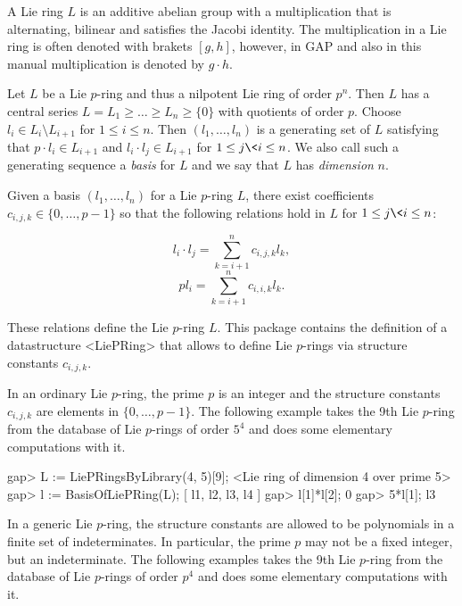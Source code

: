

A Lie ring $L$ is an additive abelian group with a multiplication that
is alternating, bilinear and satisfies the Jacobi identity. The 
multiplication in a Lie ring is often denoted with brakets $[g,h]$, 
however, in GAP and also in this manual multiplication is denoted by
$g \cdot h$. 

Let $L$ be a Lie $p$-ring and thus a nilpotent Lie ring of order $p^n$.
Then $L$ has a central series $L = L_1 \geq \ldots \geq L_n \geq \{0\}$ 
with quotients of order $p$. Choose $l_i \in L_i \setminus L_{i+1}$ for 
$1 \leq i \leq n$. Then $(l_1, \ldots, l_n)$ is a generating set of $L$ 
satisfying that $p \cdot l_i \in L_{i+1}$ and $l_i \cdot l_j \in L_{i+1}$ 
for $1 \leq j \< i \leq n$. We also call such a generating sequence
a {\it basis} for $L$ and we say that $L$ has {\it dimension} $n$.

Given a basis $(l_1, \ldots, l_n)$ for a Lie $p$-ring $L$, there exist 
coefficients $c_{i,j,k} \in \{0, \ldots, p-1\}$ so that the following 
relations hold in $L$ for $1 \leq j \< i \leq n$:

$$ l_i \cdot l_j = \sum_{k=i+1}^n c_{i,j,k} l_k, $$ 
$$ p l_i = \sum_{k=i+1}^n c_{i,i,k} l_k. $$

These relations define the Lie $p$-ring $L$. This package contains the
definition of a datastructure <LiePRing> that allows to define Lie $p$-rings
via structure constants $c_{i,j,k}$. 


In an ordinary Lie $p$-ring, the prime $p$ is an integer and the structure
constants $c_{i,j,k}$ are elements in $\{0, \ldots, p-1\}$. The following 
example takes the 9th Lie $p$-ring from the database of Lie $p$-rings of 
order $5^4$ and does some elementary computations with it.

\beginexample
gap> L := LiePRingsByLibrary(4, 5)[9];
<Lie ring of dimension 4 over prime 5>
gap> l := BasisOfLiePRing(L);
[ l1, l2, l3, l4 ]
gap> l[1]*l[2];
0
gap> 5*l[1];
l3
\endexample


In a generic Lie $p$-ring, the structure constants are allowed to be 
polynomials in a finite set of indeterminates. In particular, the prime 
$p$ may not be a fixed integer, but an indeterminate. The following examples 
takes the 9th Lie $p$-ring from the database of Lie $p$-rings of order $p^4$ 
and does some elementary computations with it.

